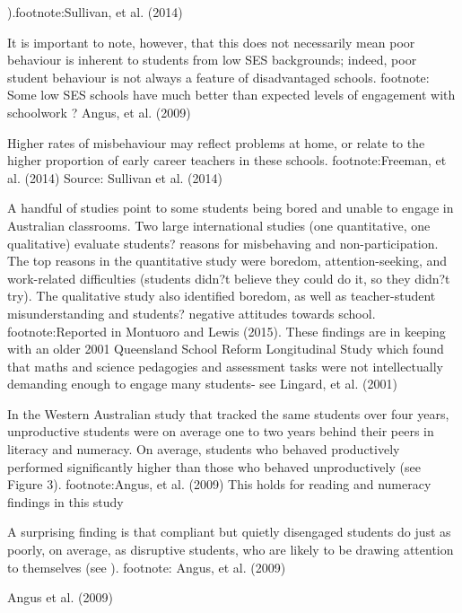 ).footnote:Sullivan, et al. (2014)

It is important to note, however, that this does not necessarily mean poor behaviour is inherent to students from low SES backgrounds; indeed, poor student behaviour is not always a feature of disadvantaged schools. footnote: Some low SES schools have much better than expected levels of engagement with schoolwork ? Angus, et al. (2009)

Higher rates of misbehaviour may reflect problems at home, or relate to the higher proportion of early career teachers in these schools. footnote:Freeman, et al. (2014)
%
{Source: Sullivan et al. (2014)}

A handful of studies point to some students being bored and unable to engage in Australian classrooms. Two large international studies (one quantitative, one qualitative) evaluate students? reasons for misbehaving and non-participation. The top reasons in the quantitative study were boredom, attention-seeking, and work-related difficulties (students didn?t believe they could do it, so they didn?t try). The qualitative study also identified boredom, as well as teacher-student misunderstanding and students? negative attitudes towards school. footnote:Reported in Montuoro and Lewis (2015). These findings are in keeping with an older 2001 Queensland School Reform Longitudinal Study which found that maths and science pedagogies and assessment tasks were not intellectually demanding enough to engage many students- see Lingard, et al. (2001)

In the Western Australian study that tracked the same students over four years, unproductive students were on average one to two years behind their peers in literacy and numeracy. On average, students who behaved productively performed significantly higher than those who behaved unproductively (see Figure 3). footnote:Angus, et al. (2009) This holds for reading and numeracy findings in this study 

A surprising finding is that compliant but quietly disengaged students do just as poorly, on average, as disruptive students, who are likely to be drawing attention to themselves (see ).  footnote: Angus, et al. (2009)

{Angus et al. (2009)}

